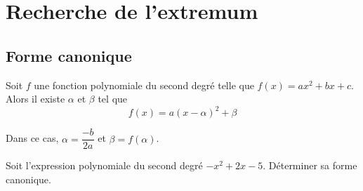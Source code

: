 \documentclass{poly}
\begin{document}
\section{Recherche de l'extremum}
\subsection{Forme canonique}
\begin{proposition}
Soit $f$ une fonction polynomiale du second degré telle que $f(x) = ax^2 + bx + c$. Alors il existe $\alpha$ et $\beta$ tel que
\begin{equation*}
f(x) = a(x - \alpha)^2 + \beta
\end{equation*}
\end{proposition}

\begin{remark}
Dans ce cas, $\alpha = \dfrac{-b}{2a}$ et $\beta = f(\alpha)$.
\end{remark}
\begin{example}
Soit l'expression polynomiale du second degré $- x^2 + 2x - 5$. Déterminer sa forme canonique.

\begin{method}
\end{method}    
\begin{method}
\end{method}
\end{example}
\newpage
\end{document}
